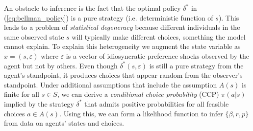 An obstacle to inference is the fact that the optimal policy $\delta^*$ in (\ref{eq:bellman_policy}) is 
a pure strategy (i.e. deterministic function of $s$).  This leads to a problem of {\it statistical degeneracy\/} because
different individuals in the same observed state $s$ will typically make different choices, something the model cannot explain. 
To explain this heterogeneity we  augment the
state variable as $x=(s,\varepsilon)$  where
$\varepsilon$ is a vector of idiosyncratic preference shocks observed by the agent but not by others.
Even though $\delta^*(s,\varepsilon)$ is still a pure strategy from the agent's standpoint, it produces choices that appear
random from the observer's standpoint. Under additional assumptions that include the assumption $A(s)$ is finite for all $s \in S$,
we can derive a {\it conditional choice probability\/} (CCP) $\pi(a|s)$ implied by the 
strategy $\delta^*$ that admits positive probabilities for all feasible choices $a \in A(s)$. Using this, we can form a likelihood
function to infer $\{\beta,r,p\}$ from data on agents' states and choices.


